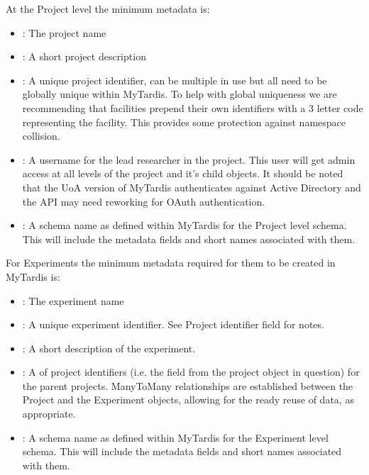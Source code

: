 \documentclass[letterpaper,10pt,english]{sphinxmanual}
\begin{document}
\sphinxAtStartPar
At the Project level the minimum metadata is:
\begin{itemize}
\item {} 
\sphinxAtStartPar
{}: The project name

\item {} 
\sphinxAtStartPar
{}: A short project description

\item {} 
\sphinxAtStartPar
{}: A unique project identifier, can be multiple in use but all need to be globally unique within MyTardis. To help with global uniqueness we are recommending that facilities prepend their own identifiers with a 3 letter code representing the facility. This provides some protection against namespace collision.

\item {} 
\sphinxAtStartPar
{}: A username for the lead researcher in the project. This user will get admin access at all levels of the project and it’s child objects. It should be noted that the UoA version of MyTardis authenticates against Active Directory and the API may need reworking for OAuth authentication.

\item {} 
\sphinxAtStartPar
{}: A schema name as defined within MyTardis for the Project level schema. This will include the metadata fields and short names associated with them.

\end{itemize}

\sphinxAtStartPar
For Experiments the minimum metadata required for them to be created in MyTardis is:
\begin{itemize}
\item {} 
\sphinxAtStartPar
{}: The experiment name

\item {} 
\sphinxAtStartPar
{}: A unique experiment identifier. See Project identifier field for notes.

\item {} 
\sphinxAtStartPar
{}: A short description of the experiment.

\item {} 
\sphinxAtStartPar
{}: A  of project identifiers (i.e. the  field from the project object in question) for the parent projects.  Many\sphinxhyphen{}To\sphinxhyphen{}Many relationships are established between the Project and the Experiment objects, allowing for the ready re\sphinxhyphen{}use of data, as appropriate.

\item {} 
\sphinxAtStartPar
{}: A schema name as defined within MyTardis for the Experiment level schema. This will include the metadata fields and short names associated with them.

\end{itemize}
\end{document}

